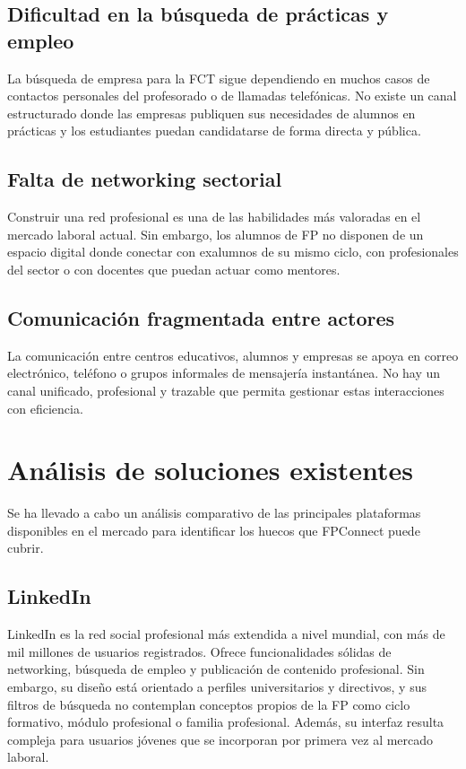 \documentclass[a4paper]{report}
\begin{document}
\subsection{Dificultad en la búsqueda de prácticas y empleo}

La búsqueda de empresa para la FCT sigue dependiendo en muchos casos de contactos personales del profesorado o de llamadas telefónicas. No existe un canal estructurado donde las empresas publiquen sus necesidades de alumnos en prácticas y los estudiantes puedan candidatarse de forma directa y pública.

\subsection{Falta de networking sectorial}

Construir una red profesional es una de las habilidades más valoradas en el mercado laboral actual. Sin embargo, los alumnos de FP no disponen de un espacio digital donde conectar con exalumnos de su mismo ciclo, con profesionales del sector o con docentes que puedan actuar como mentores.

\subsection{Comunicación fragmentada entre actores}

La comunicación entre centros educativos, alumnos y empresas se apoya en correo electrónico, teléfono o grupos informales de mensajería instantánea. No hay un canal unificado, profesional y trazable que permita gestionar estas interacciones con eficiencia.

\section{Análisis de soluciones existentes}

Se ha llevado a cabo un análisis comparativo de las principales plataformas disponibles en el mercado para identificar los huecos que FPConnect puede cubrir.

\subsection{LinkedIn}

LinkedIn es la red social profesional más extendida a nivel mundial, con más de mil millones de usuarios registrados. Ofrece funcionalidades sólidas de networking, búsqueda de empleo y publicación de contenido profesional. Sin embargo, su diseño está orientado a perfiles universitarios y directivos, y sus filtros de búsqueda no contemplan conceptos propios de la FP como ciclo formativo, módulo profesional o familia profesional. Además, su interfaz resulta compleja para usuarios jóvenes que se incorporan por primera vez al mercado laboral.
\end{document}
